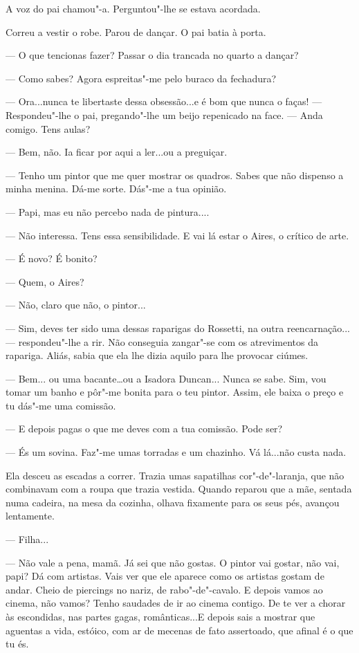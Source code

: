A voz do pai chamou"-a. Perguntou"-lhe se estava acordada.

Correu a vestir o robe. Parou de dançar. O pai batia à porta.

--- O que tencionas fazer? Passar o dia trancada no quarto a dançar?

--- Como sabes? Agora espreitas"-me pelo buraco da fechadura?

--- Ora...nunca te libertaste dessa obsessão...e é bom que nunca o faças!
--- Respondeu"-lhe o pai, pregando"-lhe um beijo repenicado na face. --- Anda
comigo. Tens aulas?

--- Bem, não. Ia ficar por aqui a ler...ou a preguiçar.

--- Tenho um pintor que me quer mostrar os quadros. Sabes que não dispenso
a minha menina. Dá-me sorte. Dás"-me a tua opinião.

--- Papi, mas eu não percebo nada de pintura....

--- Não interessa. Tens essa sensibilidade. E vai lá estar o Aires, o
crítico de arte.

--- É novo? É bonito?

--- Quem, o Aires?

--- Não, claro que não, o pintor...

--- Sim, deves ter sido uma dessas raparigas do Rossetti, na outra
reencarnação... --- respondeu"-lhe a rir. Não conseguia zangar"-se com os
atrevimentos da rapariga. Aliás, sabia que ela lhe dizia aquilo para lhe
provocar ciúmes.

--- Bem... ou uma bacante\ldots{}ou a Isadora Duncan... Nunca se sabe. Sim,
vou tomar um banho e pôr"-me bonita para o teu pintor. Assim, ele baixa o
preço e tu dás"-me uma comissão.

--- E depois pagas o que me deves com a tua comissão. Pode ser?

--- És um sovina. Faz"-me umas torradas e um chazinho. Vá lá...não custa
nada.

Ela desceu as escadas a correr. Trazia umas sapatilhas cor"-de"-laranja,
que não combinavam com a roupa que trazia vestida. Quando reparou que a
mãe, sentada numa cadeira, na mesa da cozinha, olhava fixamente para os
seus pés, avançou lentamente.

--- Filha...

--- Não vale a pena, mamã. Já sei que não gostas. O pintor vai gostar, não
vai, papi? Dá com artistas. Vais ver que ele aparece como os artistas
gostam de andar. Cheio de piercings no nariz, de rabo"-de"-cavalo. E
depois vamos ao cinema, não vamos? Tenho saudades de ir ao cinema
contigo. De te ver a chorar às escondidas, nas partes gagas,
românticas...E depois sais a mostrar que aguentas a vida, estóico, com
ar de mecenas de fato assertoado, que afinal é o que tu és.

